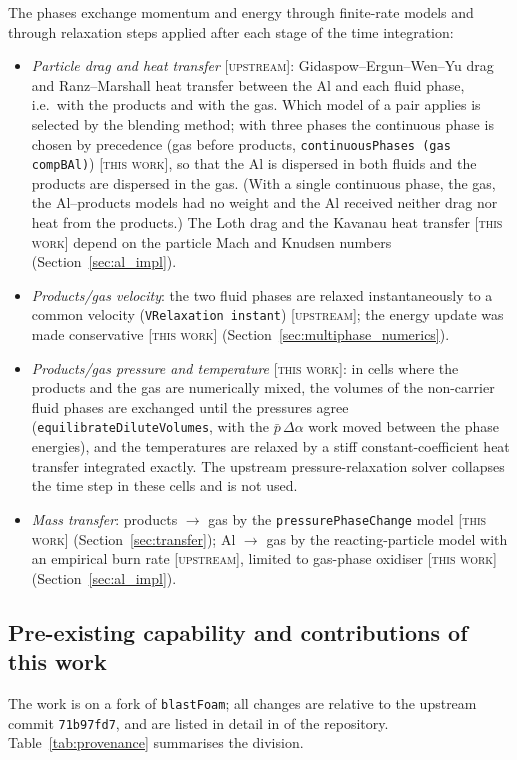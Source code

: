 \documentclass{article}
\newcommand{\up}{\textsc{[upstream]}}
\newcommand{\tw}{\textsc{[this work]}}
\begin{document}
The phases exchange momentum and energy through finite-rate models and through relaxation steps applied after each stage of the time integration:
\begin{itemize}
    \item \emph{Particle drag and heat transfer} \up: Gidaspow--Ergun--Wen--Yu drag and Ranz--Marshall heat transfer between the Al and each fluid phase, i.e.\ with the products and with the gas. Which model of a pair applies is selected by the blending method; with three phases the continuous phase is chosen by precedence (gas before products, \texttt{continuousPhases (gas compBAl)}) \tw, so that the Al is dispersed in both fluids and the products are dispersed in the gas. (With a single continuous phase, the gas, the Al--products models had no weight and the Al received neither drag nor heat from the products.) The Loth drag and the Kavanau heat transfer \tw{} depend on the particle Mach and Knudsen numbers (Section~\ref{sec:al_impl}).
    \item \emph{Products/gas velocity}: the two fluid phases are relaxed instantaneously to a common velocity (\texttt{VRelaxation instant}) \up; the energy update was made conservative \tw{} (Section~\ref{sec:multiphase_numerics}).
    \item \emph{Products/gas pressure and temperature} \tw: in cells where the products and the gas are numerically mixed, the volumes of the non-carrier fluid phases are exchanged until the pressures agree (\texttt{equilibrateDiluteVolumes}, with the $\bar p\,\Delta\alpha$ work moved between the phase energies), and the temperatures are relaxed by a stiff constant-coefficient heat transfer integrated exactly. The upstream pressure-relaxation solver collapses the time step in these cells and is not used.
    \item \emph{Mass transfer}: products $\to$ gas by the \texttt{pressurePhaseChange} model \tw{} (Section~\ref{sec:transfer}); Al $\to$ gas by the reacting-particle model with an empirical burn rate \up, limited to gas-phase oxidiser \tw{} (Section~\ref{sec:al_impl}).
\end{itemize}

\subsection{Pre-existing capability and contributions of this work}
\label{sec:provenance}

The work is on a fork of \texttt{blastFoam}; all changes are relative to the upstream commit \texttt{71b97fd7}, and are listed in detail in  of the repository. Table~\ref{tab:provenance} summarises the division.
\end{document}
